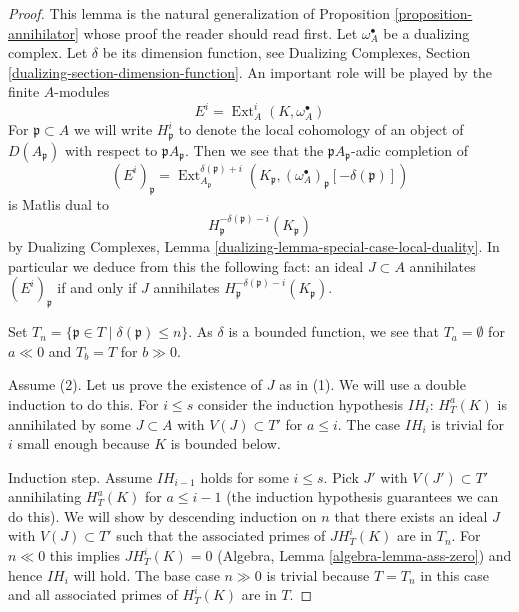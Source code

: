 \documentclass[10pt,a4paper]{amsart}
\theoremstyle{plain}
\theoremstyle{definition}
\theoremstyle{remark}
\numberwithin{equation}{subsection}
\def\Ext{\mathop{\mathrm{Ext}}\nolimits}
\begin{document}
\begin{proof}
This lemma is the natural generalization of
Proposition \ref{proposition-annihilator}
whose proof the reader should read first.
Let $\omega_A^\bullet$ be a dualizing complex. Let $\delta$ be its
dimension function, see Dualizing Complexes, Section
\ref{dualizing-section-dimension-function}.
An important role will be played by the finite $A$-modules
$$
E^i = \Ext_A^i(K, \omega_A^\bullet)
$$
For $\mathfrak p \subset A$ we will write $H^i_\mathfrak p$ to denote the
local cohomology of an object of $D(A_\mathfrak p)$ with respect to
$\mathfrak pA_\mathfrak p$. Then we see that
the $\mathfrak pA_\mathfrak p$-adic completion of
$$
(E^i)_\mathfrak p =
\Ext^{\delta(\mathfrak p) + i}_{A_\mathfrak p}(K_\mathfrak p,
(\omega_A^\bullet)_\mathfrak p[-\delta(\mathfrak p)])
$$
is Matlis dual to
$$
H^{-\delta(\mathfrak p) - i}_{\mathfrak p}(K_\mathfrak p)
$$
by
Dualizing Complexes, Lemma \ref{dualizing-lemma-special-case-local-duality}.
In particular we deduce from this the
following fact: an ideal $J \subset A$ annihilates
$(E^i)_\mathfrak p$ if and only if $J$ annihilates
$H^{-\delta(\mathfrak p) - i}_{\mathfrak p}(K_\mathfrak p)$.

\medskip\noindent
Set $T_n = \{\mathfrak p \in T \mid \delta(\mathfrak p) \leq n\}$.
As $\delta$ is a bounded function, we see that
$T_a = \emptyset$ for $a \ll 0$ and $T_b = T$ for $b \gg 0$.

\medskip\noindent
Assume (2). Let us prove the existence of $J$ as in (1).
We will use a double induction to do this. For $i \leq s$
consider the induction hypothesis $IH_i$:
$H^a_T(K)$ is annihilated by some $J \subset A$ with $V(J) \subset T'$
for $a \leq i$. The case $IH_i$ is trivial for $i$ small
enough because $K$ is bounded below.

\medskip\noindent
Induction step. Assume $IH_{i - 1}$ holds for some $i \leq s$.
Pick $J'$ with $V(J') \subset T'$ annihilating $H^a_T(K)$ for
$a \leq i - 1$ (the induction hypothesis guarantees we can
do this). We will show by descending induction on $n$
that there exists an ideal $J$ with $V(J) \subset T'$ such that the
associated primes of $J H^i_T(K)$ are in $T_n$.
For $n \ll 0$ this implies $JH^i_T(K) = 0$ 
(Algebra, Lemma \ref{algebra-lemma-ass-zero})
and hence $IH_i$ will hold.
The base case $n \gg 0$ is trivial because $T = T_n$ in this case
and all associated primes of $H^i_T(K)$ are in $T$.


\end{proof}
\end{document}

